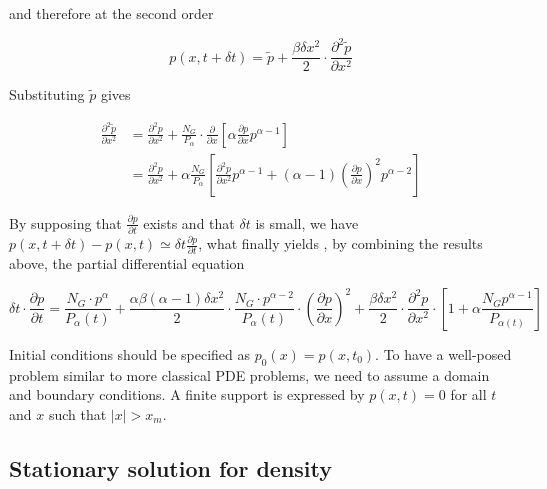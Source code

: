 and therefore at the second order

\[
p(x,t+\delta t) = \tilde{p} + \frac{\beta \delta x^2}{2} \cdot \frac{\partial^2 \tilde{p}}{\partial x^2}
\]

Substituting $\tilde{p}$ gives

\[
\begin{split}
\frac{\partial^2 \tilde{p}}{\partial x^2} & = \frac{\partial^2 p}{\partial x^2} + \frac{N_G}{P_\alpha}\cdot \frac{\partial}{\partial x}\left[\alpha \frac{\partial p}{\partial x} p^{\alpha - 1}\right]\\
& = \frac{\partial^2 p}{\partial x^2} + \alpha \frac{N_G}{P_\alpha} \left[\frac{\partial^2 p}{\partial x^2} p^{\alpha - 1} + (\alpha - 1) \left( \frac{\partial p}{\partial x}\right)^2 p^{\alpha - 2}\right]
\end{split}
\]

By supposing that $\frac{\partial p}{\partial t}$ exists and that $\delta t$ is small, we have $p(x,t+\delta t) - p(x,t) \simeq \delta t\frac{\partial p}{\partial t}$, what finally yields , by combining the results above, the partial differential equation


\begin{equation}\label{eq:pde}
\delta t \cdot \frac{\partial p}{\partial t} = \frac{N_G \cdot p^{\alpha}}{P_{\alpha}(t)} + \frac{\alpha \beta (\alpha - 1) \delta x^2}{2}\cdot \frac{N_G \cdot p^{\alpha-2}}{P_{\alpha}(t)} \cdot \left(\frac{\partial p}{\partial x}\right)^2 + \frac{\beta \delta x^2}{2} \cdot \frac{\partial^2 p}{\partial x^2} \cdot\left[ 1 + \alpha \frac{N_G p^{\alpha - 1}}{P_{\alpha(t)}} \right]
\end{equation}



Initial conditions should be specified as $p_0(x) = p(x,t_0)$. To have a well-posed problem similar to more classical PDE problems, we need to assume a domain and boundary conditions. A finite support is expressed by $p(x,t)=0$ for all $t$ and $x$ such that $\left|x\right|>x_m$.



\subsection*{Stationary solution for density}

